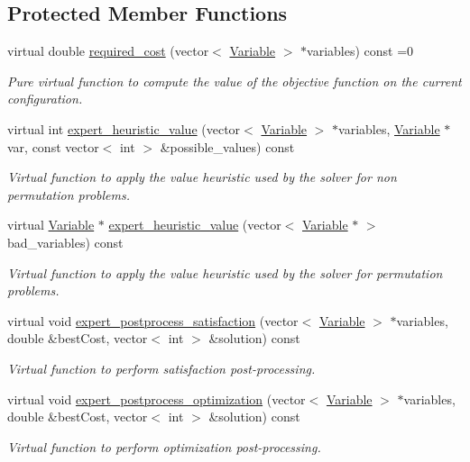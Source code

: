 \subsection*{Protected Member Functions}
\begin{DoxyCompactItemize}
\item 
virtual double \hyperlink{classghost_1_1Objective_a5f6db473f497e84cf15d0a638be21d31}{required\+\_\+cost} (vector$<$ \hyperlink{classghost_1_1Variable}{Variable} $>$ $\ast$variables) const =0
\begin{DoxyCompactList}\small\item\em Pure virtual function to compute the value of the objective function on the current configuration. \end{DoxyCompactList}\item 
virtual int \hyperlink{classghost_1_1Objective_a4e0f733d219978343b9532d1e8168510}{expert\+\_\+heuristic\+\_\+value} (vector$<$ \hyperlink{classghost_1_1Variable}{Variable} $>$ $\ast$variables, \hyperlink{classghost_1_1Variable}{Variable} $\ast$var, const vector$<$ int $>$ \&possible\+\_\+values) const 
\begin{DoxyCompactList}\small\item\em Virtual function to apply the value heuristic used by the solver for non permutation problems. \end{DoxyCompactList}\item 
virtual \hyperlink{classghost_1_1Variable}{Variable} $\ast$ \hyperlink{classghost_1_1Objective_a26e649c3e9a6e71fbdac3194120728bb}{expert\+\_\+heuristic\+\_\+value} (vector$<$ \hyperlink{classghost_1_1Variable}{Variable} $\ast$ $>$ bad\+\_\+variables) const 
\begin{DoxyCompactList}\small\item\em Virtual function to apply the value heuristic used by the solver for permutation problems. \end{DoxyCompactList}\item 
virtual void \hyperlink{classghost_1_1Objective_a0d84f1a341b9366a66b3cb52568ded33}{expert\+\_\+postprocess\+\_\+satisfaction} (vector$<$ \hyperlink{classghost_1_1Variable}{Variable} $>$ $\ast$variables, double \&best\+Cost, vector$<$ int $>$ \&solution) const 
\begin{DoxyCompactList}\small\item\em Virtual function to perform satisfaction post-\/processing. \end{DoxyCompactList}\item 
virtual void \hyperlink{classghost_1_1Objective_a5fb30d2973d51e6c788533f7a4b1c493}{expert\+\_\+postprocess\+\_\+optimization} (vector$<$ \hyperlink{classghost_1_1Variable}{Variable} $>$ $\ast$variables, double \&best\+Cost, vector$<$ int $>$ \&solution) const 
\begin{DoxyCompactList}\small\item\em Virtual function to perform optimization post-\/processing. \end{DoxyCompactList}\end{DoxyCompactItemize}
